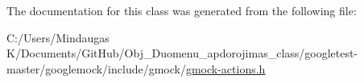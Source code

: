 The documentation for this class was generated from the following file\+:\begin{DoxyCompactItemize}
\item 
C\+:/\+Users/\+Mindaugas K/\+Documents/\+Git\+Hub/\+Obj\+\_\+\+Duomenu\+\_\+apdorojimas\+\_\+class/googletest-\/master/googlemock/include/gmock/\mbox{\hyperlink{googletest-master_2googlemock_2include_2gmock_2gmock-actions_8h}{gmock-\/actions.\+h}}\end{DoxyCompactItemize}
